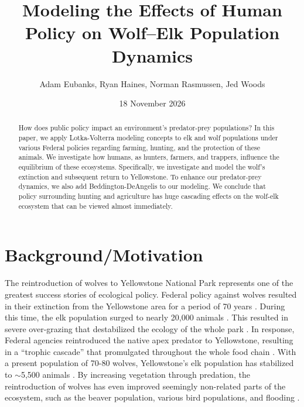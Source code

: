 \documentclass[11pt]{amsart}
\begin{document}
\title{Modeling the Effects of Human Policy on Wolf--Elk Population Dynamics}
\author{Adam Eubanks, Ryan Haines, Norman Rasmussen, Jed Woods}

\date{18 November 2026} %

\maketitle %

\begin{abstract}
How does public policy impact an environment's predator-prey populations? In this paper, we apply Lotka-Volterra modeling concepts to elk and wolf populations under various Federal policies regarding farming, hunting, and the protection of these animals. We investigate how humans, as hunters, farmers, and trappers, influence the equilibrium of these ecosystems. Specifically, we investigate and model the wolf's extinction and subsequent return to Yellowstone. To enhance our predator-prey dynamics, we also add Beddington-DeAngelis to our modeling. We conclude that policy surrounding hunting and agriculture has huge cascading effects on the wolf-elk ecosystem that can be viewed almost immediately.
\end{abstract}

\section{Background/Motivation}


The reintroduction of wolves to Yellowstone National Park represents one of the greatest success stories of ecological policy. Federal policy against wolves resulted in their extinction from the Yellowstone area for a period of 70 years \cite{nps_wolf_history}. During this time, the elk population surged to nearly 20,000 animals \cite{nps_elk}. This resulted in severe over-grazing that destabilized the ecology of the whole park \cite{nps_cycles}. In response, Federal agencies reintroduced the native apex predator to Yellowstone, resulting in a ``trophic cascade'' that promulgated throughout the whole food chain \cite{nps_wolf_history}. With a present population of 70-80 wolves, Yellowstone's elk population has stabilized to $\sim$5,500 animals \cite{nps_wolf_management,nps_elk}. By increasing vegetation through predation, the reintroduction of wolves has even improved seemingly non-related parts of the ecosystem, such as the beaver population, various bird populations, and flooding \cite{ripple2012}.
\end{document}

